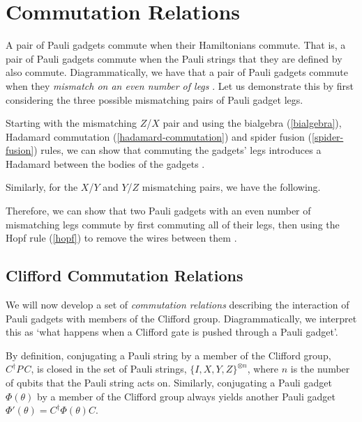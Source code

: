 \section{Commutation Relations}%
\label{commutation-relations}

A pair of Pauli gadgets commute when their Hamiltonians commute. That is, a pair of Pauli gadgets commute when the Pauli strings that they are defined by also commute. Diagrammatically, we have that a pair of Pauli gadgets commute when they \textit{mismatch on an even number of legs} \cite{Yeung2020}. Let us demonstrate this by first considering the three possible mismatching pairs of Pauli gadget legs.


Starting with the mismatching $Z$/$X$ pair and using the bialgebra (\ref{bialgebra}), Hadamard commutation (\ref{hadamard-commutation}) and spider fusion (\ref{spider-fusion}) rules, we can show that commuting the gadgets' legs introduces a Hadamard between the bodies of the gadgets \cite{Yeung2020}.


Similarly, for the $X$/$Y$ and $Y$/$Z$ mismatching pairs, we have the following.


Therefore, we can show that two Pauli gadgets with an even number of mismatching legs commute by first commuting all of their legs, then using the Hopf rule (\ref{hopf}) to remove the wires between them \cite{Yeung2020}.


\subsection{Clifford Commutation Relations}%
\label{clifford-commutation-relations}

We will now develop a set of \textit{commutation relations} describing the interaction of Pauli gadgets with members of the Clifford group. Diagrammatically, we interpret this as `what happens when a Clifford gate is pushed through a Pauli gadget'.

By definition, conjugating a Pauli string by a member of the Clifford group, $C^\dagger P \, C$, is closed in the set of Pauli strings, $\{I, X, Y, Z\}^{\otimes n}$, where $n$ is the number of qubits that the Pauli string acts on. Similarly, conjugating a Pauli gadget $\Phi(\theta)$ by a member of the Clifford group always yields another Pauli gadget $\Phi'(\theta) = C^\dagger \Phi(\theta) C$.

